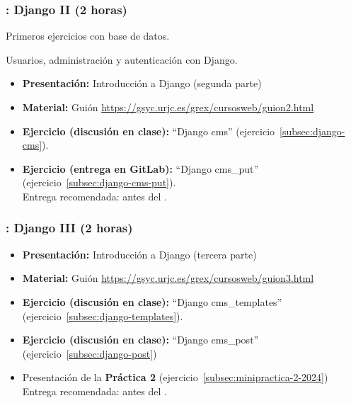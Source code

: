 \documentclass[a4paper,12pt]{article}
\begin{document}
\subsubsection{\juevesH: Django II (2 horas)}
\label{cal:juevesH}

Primeros ejercicios con base de datos.

Usuarios, administración y autenticación con Django.

\begin{itemize}
 \item \textbf{Presentación:} Introducción a Django (segunda parte)
  \item \textbf{Material:} Guión \url{https://gsyc.urjc.es/grex/cursosweb/guion2.html}
 \item \textbf{Ejercicio  (discusión en clase):} ``Django cms'' (ejercicio~\ref{subsec:django-cms}). \\
 \item \textbf{Ejercicio (entrega en GitLab):} ``Django cms\_put'' (ejercicio~\ref{subsec:django-cms-put}). \\
  Entrega recomendada: antes del \juevesI.
\end{itemize}

\subsubsection{\juevesI: Django III (2 horas)}
\label{cal:juevesI}

\begin{itemize}
 \item \textbf{Presentación:} Introducción a Django (tercera parte)
  \item \textbf{Material:} Guión \url{https://gsyc.urjc.es/grex/cursosweb/guion3.html}
 \item \textbf{Ejercicio (discusión en clase):} ``Django cms\_templates'' (ejercicio~\ref{subsec:django-templates}).
 \item \textbf{Ejercicio (discusión en clase):} ``Django cms\_post'' (ejercicio~\ref{subsec:django-post}) \\
  \item Presentación de la \textbf{Práctica 2} (ejercicio~\ref{subsec:minipractica-2-2024}) \\
  Entrega recomendada: antes del \juevesK.
\end{itemize}
\end{document}
